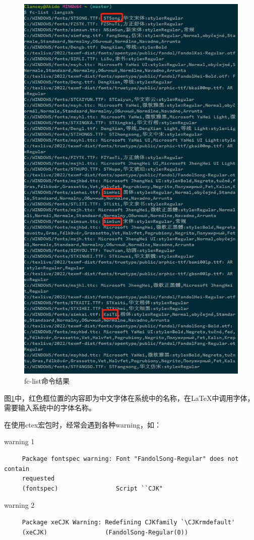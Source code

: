 \documentclass[12pt]{book}
\begin{document}
\begin{figure}[htbp]
     \centering
     \includegraphics[width=0.8\linewidth]{lang=zh.jpg}
     \caption{fc-list命令结果}
     \label{fc-list}
\end{figure}

图\ref{fc-list}中，红色框位置的内容即为中文字体在系统中的名称，在\LaTeX{}中调用字体，需要输入系统中的字体名称。

在使用ctex宏包时，经常会遇到各种warning，如：

warning 1
\begin{verbatim}
     Package fontspec warning: Font "FandolSong-Regular" does not contain
     requested 
     (fontspec)                Script ``CJK"
\end{verbatim}

warning 2
\begin{verbatim}
     Package xeCJK Warning: Redefining CJKfamily `\CJKrmdefault'
     (xeCJK)                (FandolSong-Regular(0))
\end{verbatim}
\end{document}
